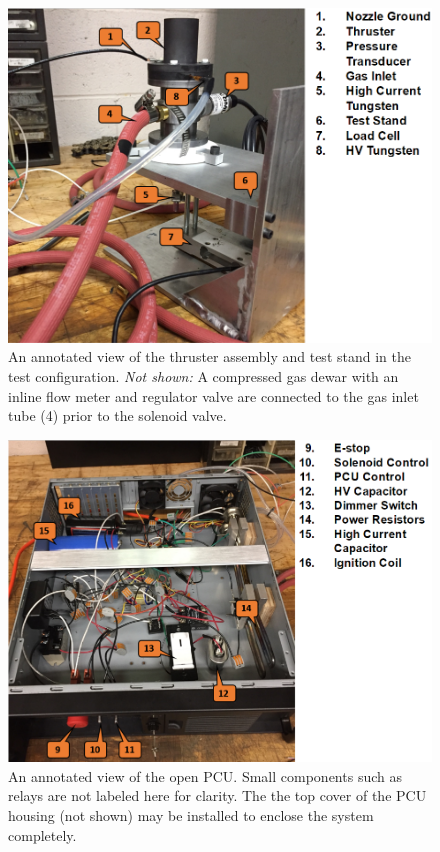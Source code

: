 \documentclass[journal]{IEEEtran}
\begin{document}
\begin{figure}[htp]
  \includegraphics[width=\linewidth]{figs/teststand-annotated.png}
  \caption{An annotated view of the thruster assembly and test stand in the test configuration.
  \emph{Not shown:} A compressed gas dewar with an inline flow meter and regulator valve are connected to the gas inlet tube (4) prior to the solenoid valve.
\label{fig:teststand-annotated}
}
\end{figure}

\begin{figure}[htp]
  \includegraphics[width=\linewidth]{figs/pcu-annotated.png}
  \caption{An annotated view of the open PCU.\@
  Small components such as relays are not labeled here for clarity.
  The the top cover of the PCU housing (not shown) may be installed to enclose the system completely.
\label{fig:pcu-annotated}
}
\end{figure}
\end{document}
